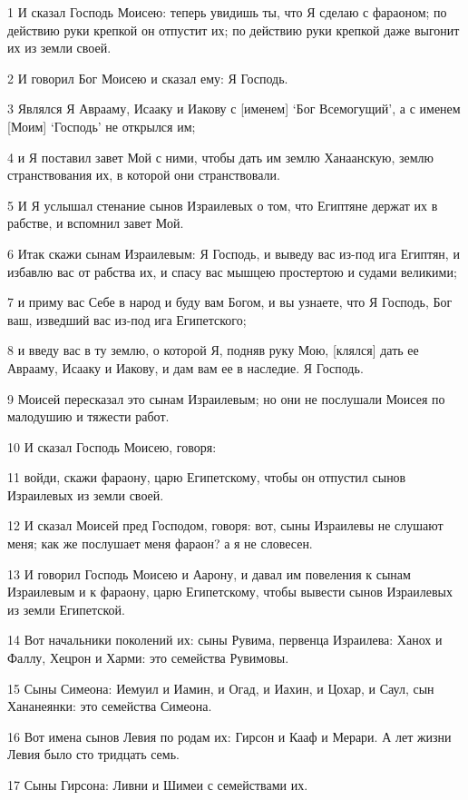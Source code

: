 \par 1 И сказал Господь Моисею: теперь увидишь ты, что Я сделаю с фараоном; по действию руки крепкой он отпустит их; по действию руки крепкой даже выгонит их из земли своей.
\par 2 И говорил Бог Моисею и сказал ему: Я Господь.
\par 3 Являлся Я Аврааму, Исааку и Иакову с [именем] `Бог Всемогущий', а с именем [Моим] `Господь' не открылся им;
\par 4 и Я поставил завет Мой с ними, чтобы дать им землю Ханаанскую, землю странствования их, в которой они странствовали.
\par 5 И Я услышал стенание сынов Израилевых о том, что Египтяне держат их в рабстве, и вспомнил завет Мой.
\par 6 Итак скажи сынам Израилевым: Я Господь, и выведу вас из-под ига Египтян, и избавлю вас от рабства их, и спасу вас мышцею простертою и судами великими;
\par 7 и приму вас Себе в народ и буду вам Богом, и вы узнаете, что Я Господь, Бог ваш, изведший вас из-под ига Египетского;
\par 8 и введу вас в ту землю, о которой Я, подняв руку Мою, [клялся] дать ее Аврааму, Исааку и Иакову, и дам вам ее в наследие. Я Господь.
\par 9 Моисей пересказал это сынам Израилевым; но они не послушали Моисея по малодушию и тяжести работ.
\par 10 И сказал Господь Моисею, говоря:
\par 11 войди, скажи фараону, царю Египетскому, чтобы он отпустил сынов Израилевых из земли своей.
\par 12 И сказал Моисей пред Господом, говоря: вот, сыны Израилевы не слушают меня; как же послушает меня фараон? а я не словесен.
\par 13 И говорил Господь Моисею и Аарону, и давал им повеления к сынам Израилевым и к фараону, царю Египетскому, чтобы вывести сынов Израилевых из земли Египетской.
\par 14 Вот начальники поколений их: сыны Рувима, первенца Израилева: Ханох и Фаллу, Хецрон и Харми: это семейства Рувимовы.
\par 15 Сыны Симеона: Иемуил и Иамин, и Огад, и Иахин, и Цохар, и Саул, сын Хананеянки: это семейства Симеона.
\par 16 Вот имена сынов Левия по родам их: Гирсон и Кааф и Мерари. А лет жизни Левия было сто тридцать семь.
\par 17 Сыны Гирсона: Ливни и Шимеи с семействами их.
